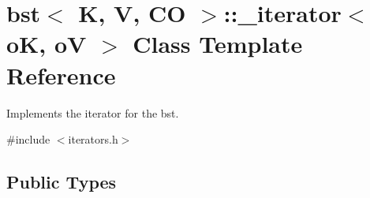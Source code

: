 \hypertarget{classbst_1_1__iterator}{}\section{bst$<$ K, V, CO $>$\+:\+:\+\_\+iterator$<$ oK, oV $>$ Class Template Reference}
\label{classbst_1_1__iterator}


Implements the iterator for the bst.  




{\ttfamily \#include $<$iterators.\+h$>$}

\subsection*{Public Types}
